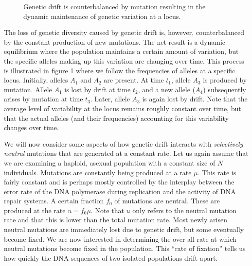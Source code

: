 \documentclass[11pt,a4paper]{book}
\newcommand{\e}{\emph}
\begin{document}
\begin{figure}[!t]
\begin{center}
\caption{Genetic drift is counterbalanced by mutation resulting in the dynamic maintenance of genetic variation at a locus.}
\label{FIGdriftalleles}
\end{center}
\end{figure} 


The loss of genetic diversity caused by genetic drift  is, however, counterbalanced by the constant production of new mutations. The net result is a dynamic equilibrium where the population maintains a certain amount of variation, but the specific alleles making up this variation are changing over time. This process is illustrated in figure \ref{FIGdriftalleles} where we follow the frequencies  of alleles at a specific locus. Initially, alleles $A_1$ and $A_2$ are present. At  time $t_1$, allele $A_3$ is produced by mutation. Allele $A_1$ is lost by drift at time $t_2$, and a new allele ($A_4$) subsequently arises by mutation at time $t_3$. Later, allele $A_3$ is again lost by drift. Note that the average level of variability at the locus remains roughly constant over time, but that the actual alleles (and their frequencies) accounting for this variability changes over time.

We will now consider some aspects of how genetic drift interacts with \e{selectively neutral} mutations that are generated at a constant rate. Let us again assume that we are examining a haploid, asexual population with a constant size of $N$ individuals. Mutations are constantly being produced at a rate $\mu$. This rate is fairly constant and is perhaps mostly controlled by the interplay between the error rate of the DNA polymerase during replication and the activity of DNA repair systems. A certain fraction $f_0$ of mutations are neutral. These are produced at the rate $u=f_0\mu$.\label{PAGEuf0mu} Note that $u$ only refers to the neutral mutation rate and that this is lower than the total mutation rate. Most newly arisen  neutral mutations are immediately lost due to genetic drift, but some eventually become fixed. We are now interested in determining the over-all rate at which neutral mutations become fixed in the population. This ``rate of fixation'' tells us how quickly the DNA sequences of two isolated populations drift  apart.
\end{document}
